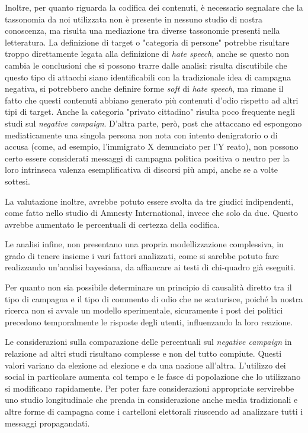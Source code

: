 Inoltre, per quanto riguarda la codifica dei contenuti, è necessario segnalare che la tassonomia da noi utilizzata non è presente in nessuno studio di nostra conoscenza, ma risulta una mediazione tra diverse tassonomie presenti nella letteratura. La definizione di target o "categoria di persone" potrebbe risultare troppo direttamente legata alla definizione di \textit{hate speech}, anche se questo non cambia le conclusioni che si possono trarre dalle analisi: risulta discutibile che questo tipo di attacchi siano identificabili con la tradizionale idea di campagna negativa, si potrebbero anche definire forme \textit{soft} di \textit{hate speech}, ma rimane il fatto che questi contenuti abbiano generato più contenuti d'odio rispetto ad altri tipi di target.
Anche la categoria "privato cittadino" risulta poco frequente negli studi sul \textit{negative campaign}. D'altra parte, però, post che attaccano ed espongono mediaticamente una singola persona non nota con intento denigratorio o di accusa (come, ad esempio, l'immigrato X denunciato per l'Y reato), non possono certo essere considerati messaggi di campagna politica positiva o neutro per la loro intrinseca valenza esemplificativa di discorsi più ampi, anche se a volte sottesi.

La valutazione inoltre, avrebbe potuto essere svolta da tre giudici indipendenti, come fatto nello studio di Amnesty International, invece che solo da due. Questo avrebbe aumentato le percentuali di certezza della codifica.

Le analisi infine, non presentano una propria modellizzazione complessiva, in grado di tenere insieme i vari fattori analizzati, come si sarebbe potuto fare realizzando un’analisi bayesiana, da affiancare ai testi di chi-quadro già eseguiti.

Per quanto non sia possibile determinare un principio di causalità diretto tra il tipo di campagna e il tipo di commento di odio che ne scaturisce, poiché la nostra ricerca non si avvale un modello sperimentale, sicuramente i post dei politici precedono temporalmente le risposte degli utenti, influenzando la loro reazione.

Le considerazioni sulla comparazione delle percentuali sul \textit{negative campaign} in relazione ad altri studi risultano complesse e non del tutto compiute. Questi valori variano da elezione ad elezione e da una nazione all’altra. L’utilizzo dei social in particolare aumenta col tempo e le fasce di popolazione che lo utilizzano si modificano rapidamente. Per poter fare considerazioni appropriate servirebbe uno studio longitudinale che prenda in considerazione anche media tradizionali e altre forme di campagna come i cartelloni elettorali riuscendo ad analizzare tutti i messaggi propagandati.


